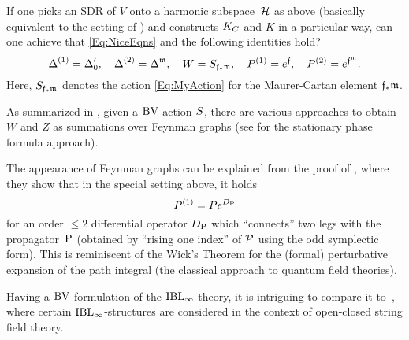 \documentclass[\MainFolder/Text.tex]{subfiles}
\begin{document}
\begin{Question}\label{Q:EqForm}
If one picks an SDR of $V$ onto a harmonic subspace~$\mathcal{H}$ as above (basically equivalent to the setting of \cite[Section~11]{Cieliebak2015}) and constructs $K_C$ and $K$ in a particular way, can one achieve that \eqref{Eq:NiceEqns} and the following identities hold?
$$ \operatorname{\Delta}^{(1)} = \operatorname{\Delta}_0',\quad \operatorname{\Delta}^{(2)} = \operatorname{\Delta}^{\mathfrak{m}}, \quad W = S_{\mathfrak{f}_* \mathfrak{m}},\quad P^{(1)} = e^{\mathfrak{f}},\quad P^{(2)}= e^{\mathfrak{f}^{\mathfrak{m}}}. $$
Here, $S_{\mathfrak{f}_*\mathfrak{m}}$ denotes the action \eqref{Eq:MyAction} for the Maurer-Cartan element $\mathfrak{f}_*\mathfrak{m}$.
\end{Question}

\begin{Remark}
\begin{RemarkList}
\item As summarized in \cite[Section~5]{Doubek2018}, given a $\mathrm{BV}$-action $S$, there are various approaches to obtain $W$ and $Z$ as summations over Feynman graphs (see \cite{Mnev2017} for the stationary phase formula approach).
\item The appearance of Feynman graphs can be explained from the proof of \cite[Theorem~2]{Doubek2018}, where they show that in the special setting above, it holds
$$ P^{(1)} = P e^{D_{\mathrm{P}}} $$
for an order $\le 2$ differential operator $D_{\mathrm{P}}$ which ``connects'' two legs with the propagator~$\mathrm{P}$ (obtained by ``rising one index'' of $\mathcal{P}$ using the odd symplectic form). This is reminiscent of the Wick's Theorem for the (formal) perturbative expansion of the path integral (the classical approach to quantum field theories).
\item Having a $\mathrm{BV}$-formulation of the $\mathrm{IBL}_\infty$-theory, it is intriguing to compare it to~\cite{Muenster2011}, where certain $\mathrm{IBL}_\infty$-structures are considered in the context of open-closed string field theory.\qedhere
\end{RemarkList}
\end{Remark}
\end{document}

